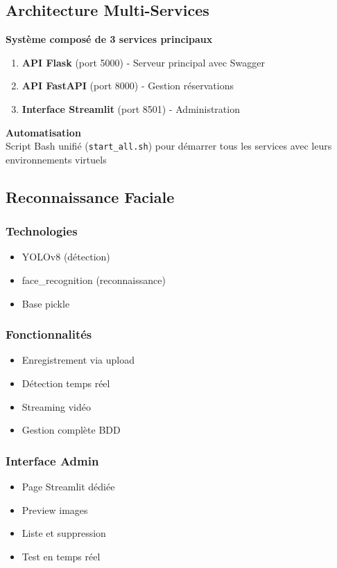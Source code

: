 \documentclass[12pt,a4paper]{article}
\newenvironment{block}[1]{\begin{center}\begin{minipage}{0.9\textwidth}\textbf{#1}\\}{\end{minipage}\end{center}}
\begin{document}
\subsection{Architecture Multi-Services}

\begin{block}{Système composé de 3 services principaux}
\begin{enumerate}
    \item \textbf{API Flask} (port 5000) - Serveur principal avec Swagger
    \item \textbf{API FastAPI} (port 8000) - Gestion réservations
    \item \textbf{Interface Streamlit} (port 8501) - Administration
\end{enumerate}
\end{block}

\begin{block}{Automatisation}
Script Bash unifié (\texttt{start\_all.sh}) pour démarrer tous les services avec leurs environnements virtuels
\end{block}

\subsection{Reconnaissance Faciale}

\subsubsection{Technologies}
\begin{itemize}
    \item YOLOv8 (détection)
    \item face\_recognition (reconnaissance)
    \item Base pickle
\end{itemize}

\subsubsection{Fonctionnalités}
\begin{itemize}
    \item Enregistrement via upload
    \item Détection temps réel
    \item Streaming vidéo
    \item Gestion complète BDD
\end{itemize}

\subsubsection{Interface Admin}
\begin{itemize}
    \item Page Streamlit dédiée
    \item Preview images
    \item Liste et suppression
    \item Test en temps réel
\end{itemize}
\end{document}
